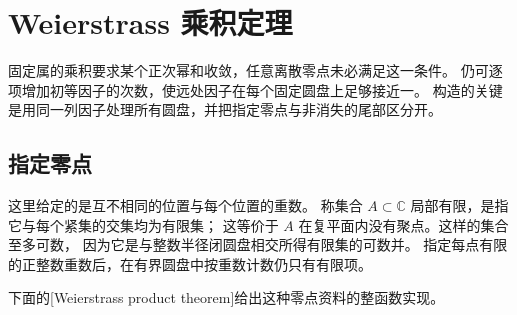 \section{Weierstrass 乘积定理}
\label{b3:sec:2003}

固定属的乘积要求某个正次幂和收敛，任意离散零点未必满足这一条件。
仍可逐项增加初等因子的次数，使远处因子在每个固定圆盘上足够接近一。
构造的关键是用同一列因子处理所有圆盘，并把指定零点与非消失的尾部区分开。

\subsection{指定零点}
\label{b3:subsec:200301}

这里给定的是互不相同的位置与每个位置的重数。
称集合 \(A\subset\mathbb C\) 局部有限，是指它与每个紧集的交集均为有限集；
这等价于 \(A\) 在复平面内没有聚点。这样的集合至多可数，
因为它是与整数半径闭圆盘相交所得有限集的可数并。
指定每点有限的正整数重数后，在有界圆盘中按重数计数仍只有有限项。

\ProseParagraphBreak
下面的[Weierstrass product theorem]给出这种零点资料的整函数实现。

